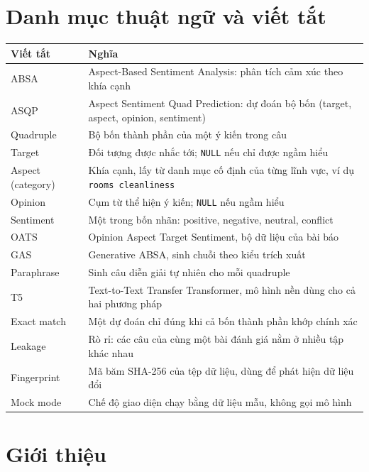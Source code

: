 \documentclass[12pt,a4paper]{report}
\newcommand{\code}[1]{\texttt{#1}}
\begin{document}
\chapter*{Danh mục thuật ngữ và viết tắt}
\begin{tabularx}{\linewidth}{@{}lX@{}}
\toprule
\textbf{Viết tắt} & \textbf{Nghĩa} \\ \midrule
ABSA & Aspect-Based Sentiment Analysis: phân tích cảm xúc theo khía cạnh \\
ASQP & Aspect Sentiment Quad Prediction: dự đoán bộ bốn (target, aspect, opinion, sentiment) \\
Quadruple & Bộ bốn thành phần của một ý kiến trong câu \\
Target & Đối tượng được nhắc tới; \code{NULL} nếu chỉ được ngầm hiểu \\
Aspect (category) & Khía cạnh, lấy từ danh mục cố định của từng lĩnh vực, ví dụ \code{rooms cleanliness} \\
Opinion & Cụm từ thể hiện ý kiến; \code{NULL} nếu ngầm hiểu \\
Sentiment & Một trong bốn nhãn: positive, negative, neutral, conflict \\
OATS & Opinion Aspect Target Sentiment, bộ dữ liệu của bài báo~\cite{oats2024} \\
GAS & Generative ABSA, sinh chuỗi theo kiểu trích xuất~\cite{gas2021} \\
Paraphrase & Sinh câu diễn giải tự nhiên cho mỗi quadruple~\cite{paraphrase2021} \\
T5 & Text-to-Text Transfer Transformer, mô hình nền dùng cho cả hai phương pháp~\cite{t5} \\
Exact match & Một dự đoán chỉ đúng khi cả bốn thành phần khớp chính xác \\
Leakage & Rò rỉ: các câu của cùng một bài đánh giá nằm ở nhiều tập khác nhau \\
Fingerprint & Mã băm SHA-256 của tệp dữ liệu, dùng để phát hiện dữ liệu đổi \\
Mock mode & Chế độ giao diện chạy bằng dữ liệu mẫu, không gọi mô hình \\
\bottomrule
\end{tabularx}

\newpage
{}

\chapter{Giới thiệu}
\end{document}

